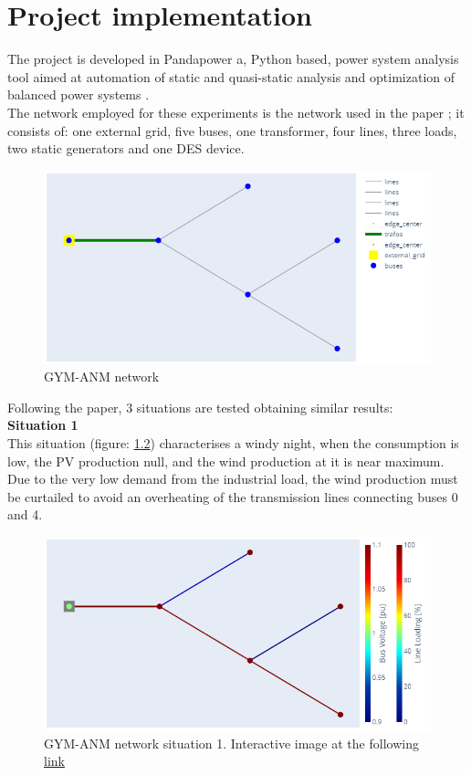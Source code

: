 \chapter{Project implementation}
The project is developed in Pandapower a, Python based, power system analysis tool aimed at automation of static and quasi-static analysis and optimization of balanced power systems \cite{pandapower}.\\
The network employed for these experiments is the network used in the paper \cite{gym-anm}; it consists of: one external grid, five buses, one transformer, four lines, three loads, two static generators and one \gls{DES} device.

\begin{figure}[h]
\centering
    \includegraphics[width=.7\linewidth]{images/GYM-ANM/NETS/Gyn-anm network.png}
\caption{GYM-ANM network}
\label{fig:gym_anm_net}
\end{figure}

\noindent Following the paper, 3 situations are tested obtaining similar results:\\
\textbf{Situation 1} \\
    This situation (figure: \ref{fig:net_sit1}) characterises a windy night, when the consumption is low, the PV
    production null, and the wind production at it is near maximum. Due to the very low demand from the industrial load, the wind production must be curtailed to avoid an overheating of the transmission lines connecting
    buses 0 and 4.
    \begin{figure}[H]
    \centering
        \includegraphics[width=.7\linewidth]{images/GYM-ANM/NETS/Gyn-anm network situation1.png}
    \caption[GYM-ANM network situation 1]{GYM-ANM network situation 1. Interactive image at the following \href{https://htmlpreview.github.io/?https://github.com/MauriVass/ThesisLiege/blob/master/Images/fig_case1.html}{link}}
    \label{fig:net_sit1}
    \end{figure}
    

